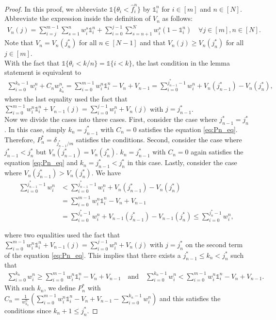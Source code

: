\documentclass{article}
\newcommand{\one}{\mathds{1}}
\newcommand{\indi}[1]{\mathds{1}\{#1\}}
\begin{document}
\begin{proof}
In this proof, we abbreviate $\indi{\theta_i < \hat{f}_i^n}$ by $\one_i^n$ for $i \in [m]$ and $n \in [N]$.
Abbreviate the expression inside the definition of $V_n$ as follows:
\begin{align}\label{eq:Vn_j_def}
V_n(j) = \sum_{i=j}^{m-1} \sum_{s=1}^{n} w_i^s \one_i^n + \sum_{i=0}^{j-1} \sum_{s=n+1}^{N}  w_i^s (1 - \one_i^n)  \quad \forall j \in [m], n \in [N].
\end{align}
Note that $V_n = V_n(j_n^*)$ for all $n \in [N-1]$ and that $V_n(j) \geq V_n(j_n^*)$ for all $j \in [m]$.
\\
With the fact that $\indi{\theta_i < k/n} = \indi{i < k}$, the last condition in the lemma statement is equivalent to 
\begin{align} 
\sum_{i=0}^{k_n-1} w_i^n + C_n w_{k_n^*}^n = \sum_{i=0}^{m-1} w_i^n \one_i^n - V_n + V_{n-1} = \sum_{i=0}^{j_{n-1}^*-1} w_i^n + V_n(j_{n-1}^*) - V_n(j_n^*), \label{eq:Pn_eq}
\end{align}
where the last equality used the fact that $\sum_{i=0}^{m-1} w_i^n \one_i^n + V_{n-1}(j) = \sum_{i=0}^{j-1} w_i^n + V_n(j)$ with $j=j_{n-1}^*$.
\smallskip \\
Now we divide the cases into three cases. 
First, consider the case where $j_{n-1}^* = j_n^*$. In this case, simply $k_n = j_{n-1}^*$ with $C_n=0$ satisfies the equation \eqref{eq:Pn_eq}. Therefore, $P_n^* = \delta_{j_{n-1}^*/m}$ satisfies the conditions.
Second, consider the case where $j_{n-1}^* < j_n^*$ but $V_n(j_{n-1}^*) = V_n(j_n^*)$. $k_n = j_{n-1}^*$ with $C_n=0$ again satisfies the equation \eqref{eq:Pn_eq} and $k_n = j_{n-1}^* < j_n^*$ in this case.
Lastly, consider the case where $V_n(j_{n-1}^*) > V_n(j_n^*)$. We have 
\begin{align*}
  \sum_{i=0}^{j_{n-1}^*-1} w_i^n 
  & < \sum_{i=0}^{j_{n-1}^*-1} w_i^n + V_n(j_{n-1}^*) - V_n(j_n^*) \\
  & = \sum_{i=0}^{m-1} w_i^n \one_i^n - V_n + V_{n-1} \\
  & = \sum_{i=0}^{j_{n}^*-1} w_i^n + V_{n-1}(j_{n-1}^*) - V_{n-1}(j_n^*) 
  \leq \sum_{i=0}^{j_{n}^*-1} w_i^n,
\end{align*}

where two equalities used the fact that $\sum_{i=0}^{m-1} w_i^n \one_i^n + V_{n-1}(j) = \sum_{i=0}^{j-1} w_i^n + V_n(j)$ with $j=j_n^*$ on the second term of the equation \eqref{eq:Pn_eq}.
This implies that there exists a $j_{n-1}^* \leq k_n < j_n^*$ such that 
\begin{align*}
  \sum_{i=0}^{k_n} w_i^n \geq \sum_{i=0}^{m-1} w_i^n \one_i^n - V_n + V_{n-1} \quad \text{and} \quad \sum_{i=0}^{k_n-1} w_i^n < \sum_{i=0}^{m-1} w_i^n \one_i^n - V_n + V_{n-1}.
\end{align*}
With such $k_n$, we define $P_n^*$ with $C_n = \frac{1}{w_{k_n}^n} \left( \sum_{i=0}^{m-1} w_i^n \one_i^n - V_n + V_{n-1} - \sum_{i=0}^{k_n-1} w_i^n \right)$ and this satisfies the conditions since $k_n+1 \leq j_n^*$.
\end{proof}
\end{document}
